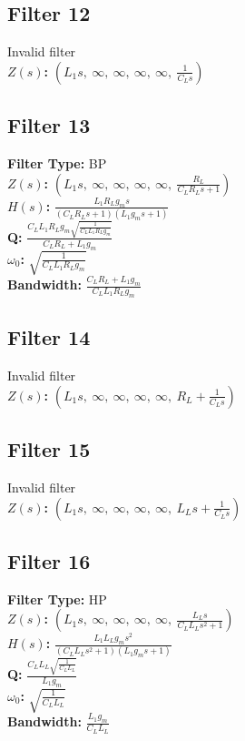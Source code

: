 \documentclass{article}
\begin{document}
\subsection*{Filter 12}
Invalid filter \\ 
\textbf{$Z(s)$:} $\left( L_{1} s, \  \infty, \  \infty, \  \infty, \  \infty, \  \frac{1}{C_{L} s}\right)$ \\ 
\subsection*{Filter 13}
\textbf{Filter Type:} BP \\ 
\textbf{$Z(s)$:} $\left( L_{1} s, \  \infty, \  \infty, \  \infty, \  \infty, \  \frac{R_{L}}{C_{L} R_{L} s + 1}\right)$ \\ 
\textbf{$H(s)$:} $\frac{L_{1} R_{L} g_{m} s}{\left(C_{L} R_{L} s + 1\right) \left(L_{1} g_{m} s + 1\right)}$ \\ 
\textbf{Q:} $\frac{C_{L} L_{1} R_{L} g_{m} \sqrt{\frac{1}{C_{L} L_{1} R_{L} g_{m}}}}{C_{L} R_{L} + L_{1} g_{m}}$ \\ 
\textbf{$\omega_0$:} $\sqrt{\frac{1}{C_{L} L_{1} R_{L} g_{m}}}$ \\ 
\textbf{Bandwidth:} $\frac{C_{L} R_{L} + L_{1} g_{m}}{C_{L} L_{1} R_{L} g_{m}}$ \\ 
\subsection*{Filter 14}
Invalid filter \\ 
\textbf{$Z(s)$:} $\left( L_{1} s, \  \infty, \  \infty, \  \infty, \  \infty, \  R_{L} + \frac{1}{C_{L} s}\right)$ \\ 
\subsection*{Filter 15}
Invalid filter \\ 
\textbf{$Z(s)$:} $\left( L_{1} s, \  \infty, \  \infty, \  \infty, \  \infty, \  L_{L} s + \frac{1}{C_{L} s}\right)$ \\ 
\subsection*{Filter 16}
\textbf{Filter Type:} HP \\ 
\textbf{$Z(s)$:} $\left( L_{1} s, \  \infty, \  \infty, \  \infty, \  \infty, \  \frac{L_{L} s}{C_{L} L_{L} s^{2} + 1}\right)$ \\ 
\textbf{$H(s)$:} $\frac{L_{1} L_{L} g_{m} s^{2}}{\left(C_{L} L_{L} s^{2} + 1\right) \left(L_{1} g_{m} s + 1\right)}$ \\ 
\textbf{Q:} $\frac{C_{L} L_{L} \sqrt{\frac{1}{C_{L} L_{L}}}}{L_{1} g_{m}}$ \\ 
\textbf{$\omega_0$:} $\sqrt{\frac{1}{C_{L} L_{L}}}$ \\ 
\textbf{Bandwidth:} $\frac{L_{1} g_{m}}{C_{L} L_{L}}$ \\ 
\end{document}
